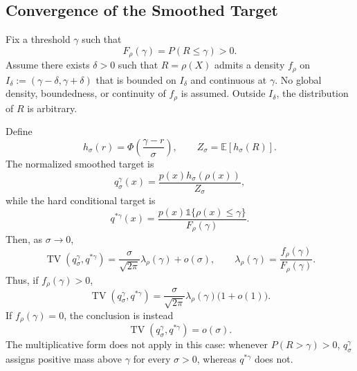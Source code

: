 \subsection{Convergence of the Smoothed Target}
\label{app:smoothing-convergence}

\begin{proposition}
\label{prop:smoothing-convergence}
Fix a threshold $\gamma$ such that
\[
    F_\rho(\gamma)
    =
    P(R\leq\gamma)
    >
    0.
\]
Assume there exists $\delta>0$ such that $R=\rho(X)$ admits a density $f_\rho$ on $I_\delta:=(\gamma-\delta,\gamma+\delta)$ that is bounded on $I_\delta$ and continuous at $\gamma$. No global density, boundedness, or continuity of $f_\rho$ is assumed. Outside $I_\delta$, the distribution of $R$ is arbitrary.

Define
\[
    h_\sigma(r)
    =
    \Phi\!\left(
        \frac{\gamma-r}{\sigma}
    \right),
    \qquad
    Z_\sigma
    =
    \mathbb E[h_\sigma(R)].
\]
The normalized smoothed target is
\[
    q_\sigma^\gamma(x)
    =
    \frac{
        p(x)h_\sigma(\rho(x))
    }{
        Z_\sigma
    },
\]
while the hard conditional target is
\[
    q^{*\gamma}(x)
    =
    \frac{
        p(x)\mathds{1}\{\rho(x)\leq\gamma\}
    }{
        F_\rho(\gamma)
    }.
\]
Then, as $\sigma\to0$,
\[
    \operatorname{TV}
    \left(
        q_\sigma^\gamma,
        q^{*\gamma}
    \right)
    =
    \frac{\sigma}{\sqrt{2\pi}}
    \lambda_\rho(\gamma)
    +
    o(\sigma),
    \qquad
    \lambda_\rho(\gamma)
    =
    \frac{
        f_\rho(\gamma)
    }{
        F_\rho(\gamma)
    }.
\]
Thus, if $f_\rho(\gamma)>0$,
\[
    \operatorname{TV}
    \left(
        q_\sigma^\gamma,
        q^{*\gamma}
    \right)
    =
    \frac{\sigma}{\sqrt{2\pi}}
    \lambda_\rho(\gamma)
    \bigl(1+o(1)\bigr).
\]
If $f_\rho(\gamma)=0$, the conclusion is instead
\[
    \operatorname{TV}
    \left(
        q_\sigma^\gamma,
        q^{*\gamma}
    \right)
    =
    o(\sigma).
\]
The multiplicative form does not apply in this case: whenever $P(R>\gamma)>0$, $q_\sigma^\gamma$ assigns positive mass above $\gamma$ for every $\sigma>0$, whereas $q^{*\gamma}$ does not.
\end{proposition}


